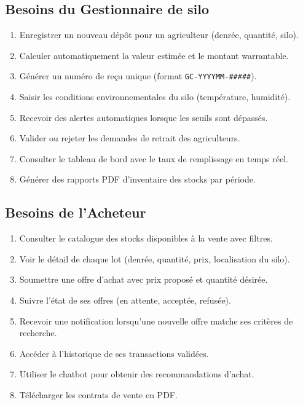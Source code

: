 \documentclass[12pt,a4paper,twoside]{report}
\begin{document}
\subsection{Besoins du Gestionnaire de silo}

\begin{enumerate}[label=\textbf{BF-G\arabic*}]
  \item Enregistrer un nouveau dépôt pour un agriculteur (denrée, quantité, silo).
  \item Calculer automatiquement la valeur estimée et le montant warrantable.
  \item Générer un numéro de reçu unique (format \texttt{GC-YYYYMM-\#\#\#\#\#}).
  \item Saisir les conditions environnementales du silo (température, humidité).
  \item Recevoir des alertes automatiques lorsque les seuils sont dépassés.
  \item Valider ou rejeter les demandes de retrait des agriculteurs.
  \item Consulter le tableau de bord avec le taux de remplissage en temps réel.
  \item Générer des rapports PDF d'inventaire des stocks par période.
\end{enumerate}

\subsection{Besoins de l'Acheteur}

\begin{enumerate}[label=\textbf{BF-AC\arabic*}]
  \item Consulter le catalogue des stocks disponibles à la vente avec filtres.
  \item Voir le détail de chaque lot (denrée, quantité, prix, localisation du silo).
  \item Soumettre une offre d'achat avec prix proposé et quantité désirée.
  \item Suivre l'état de ses offres (en attente, acceptée, refusée).
  \item Recevoir une notification lorsqu'une nouvelle offre matche ses critères de recherche.
  \item Accéder à l'historique de ses transactions validées.
  \item Utiliser le chatbot pour obtenir des recommandations d'achat.
  \item Télécharger les contrats de vente en PDF.
\end{enumerate}
\end{document}
